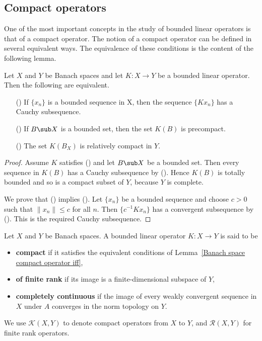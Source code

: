 \subsection{Compact operators}
One of the most important concepts in the study of bounded linear operators is that of a compact operator. The notion of a compact operator can be defined in several equivalent ways. The equivalence of these conditions is the content of the following lemma.
\begin{lemma}\label{Banach space compact operator iff}
Let $X$ and $Y$ be Banach spaces and let $K:X\to Y$ be a bounded linear operator. Then the following are equivalent.
\begin{itemize}
\item[(\rmnum{1})] If $\{x_n\}$ is a bounded sequence in X, then the sequence $\{Kx_n\}$ has a Cauchy subsequence.
\item[(\rmnum{2})] If $B\sub X$ is a bounded set, then the set $K(B)$ is precompact.
\item[(\rmnum{3})] The set $K(B_X)$ is relatively compact in $Y$.
\end{itemize}
\end{lemma}
\begin{proof}
Assume $K$ satisfies () and let $B\sub X$ be a bounded set. Then every sequence in $K(B)$ has a Cauchy subsequence by (). Hence $K(B)$ is totally bounded and so is a compact subset of $Y$, because $Y$ is complete.\par
We prove that () implies (). Let $\{x_n\}$ be a bounded sequence and choose $c>0$ such that $\|x_n\|\leq c$ for all $n$. Then $\{c^{-1}Kx_n\}$ has a convergent subsequence  by (). This is the required Cauchy subsequence.
\end{proof}
\begin{definition}
Let $X$ and $Y$ be Banach spaces. A bounded linear operator $K:X\to Y$ is said to be
\begin{itemize}
\item \textbf{compact} if it satisfies the equivalent conditions of Lemma~\ref{Banach space compact operator iff},
\item \textbf{of finite rank} if its image is a finite-dimensional subspace of $Y$,
\item \textbf{completely continuous} if the image of every weakly convergent sequence in $X$ under $A$ converges in the norm topology on $Y$.
\end{itemize}
We use $\mathcal{K}(X,Y)$ to denote compact operators from $X$ to $Y$, and $\mathcal{R}(X,Y)$ for finite rank operators.
\end{definition}
